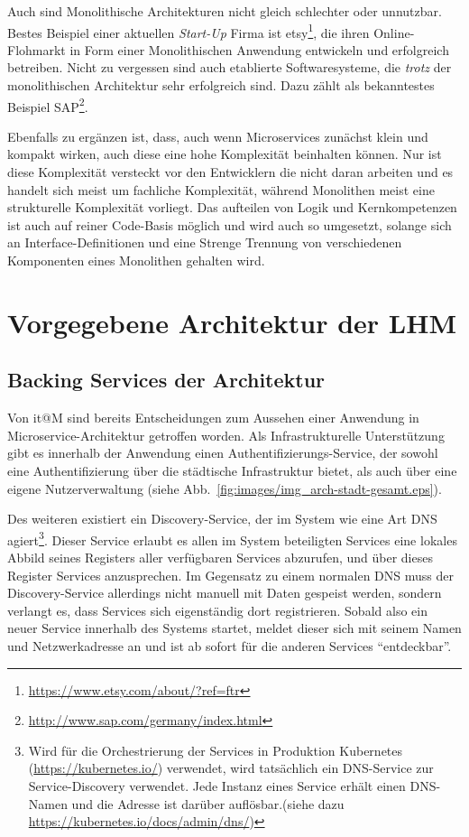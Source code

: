 \documentclass[12pt,a4paper,bibliography=totocnumbered,listof=totocnumbered]{scrartcl}
\begin{document}
Auch sind Monolithische Architekturen nicht gleich schlechter oder unnutzbar. Bestes Beispiel einer aktuellen \textit{Start-Up} Firma ist etsy\footnote{\url{https://www.etsy.com/about/?ref=ftr}}, die ihren Online-Flohmarkt in Form einer Monolithischen Anwendung entwickeln und erfolgreich betreiben. Nicht zu vergessen sind auch etablierte Softwaresysteme, die \textit{trotz} der monolithischen Architektur sehr erfolgreich sind. Dazu zählt als bekanntestes Beispiel SAP\footnote{\url{http://www.sap.com/germany/index.html}}.

Ebenfalls zu ergänzen ist, dass, auch wenn Microservices zunächst klein und kompakt wirken, auch diese eine hohe Komplexität beinhalten können. Nur ist diese Komplexität versteckt vor den Entwicklern die nicht daran arbeiten und es handelt sich meist um fachliche Komplexität, während Monolithen meist eine strukturelle Komplexität vorliegt. Das aufteilen von Logik und Kernkompetenzen ist auch auf reiner Code-Basis möglich und wird auch so umgesetzt, solange sich an Interface-Definitionen und eine Strenge Trennung von verschiedenen Komponenten eines Monolithen gehalten wird.\cite{hoff}

\section{Vorgegebene Architektur der \acf{LHM}}\label{ch:arch-itm}

\subsection{Backing Services der Architektur}

Von it@M sind bereits Entscheidungen zum Aussehen einer Anwendung in Microservice-Architektur getroffen worden. Als Infrastrukturelle Unterstützung gibt es innerhalb der Anwendung einen Authentifizierungs-Service, der sowohl eine Authentifizierung über die städtische Infrastruktur bietet, als auch über eine eigene Nutzerverwaltung (siehe Abb.~\ref{fig:images/img_arch-stadt-gesamt.eps}).

Des weiteren existiert ein Discovery-Service, der im System wie eine Art \acs{DNS} agiert\footnote{Wird für die Orchestrierung der Services in Produktion Kubernetes (\url{https://kubernetes.io/}) verwendet, wird tatsächlich ein DNS-Service zur Service-Discovery verwendet. Jede Instanz eines Service erhält einen DNS-Namen und die Adresse ist darüber auflösbar.(siehe dazu \url{https://kubernetes.io/docs/admin/dns/})}. Dieser Service erlaubt es allen im System beteiligten Services eine lokales Abbild seines Registers aller verfügbaren Services abzurufen, und über dieses Register Services anzusprechen. Im Gegensatz zu einem normalen \ac{DNS} muss der Discovery-Service allerdings nicht manuell mit Daten gespeist werden, sondern verlangt es, dass Services sich eigenständig dort registrieren. Sobald also ein neuer Service innerhalb des Systems startet, meldet dieser sich mit seinem Namen und Netzwerkadresse an und ist ab sofort für die anderen Services \enquote{entdeckbar}.
\end{document}
